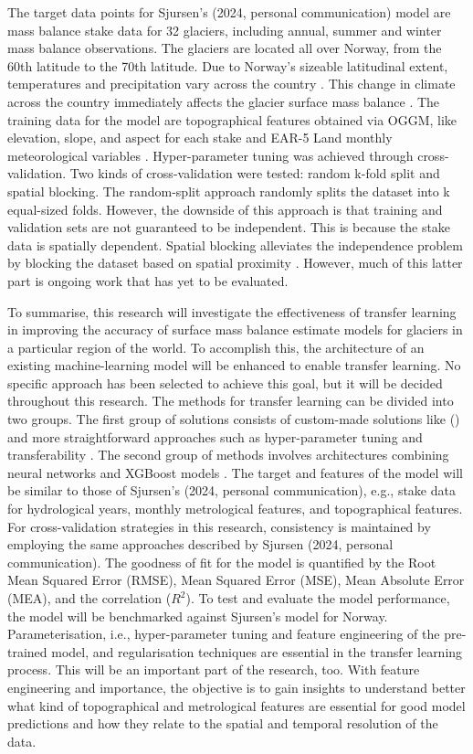 The target data points for Sjursen's (2024, personal communication) model are mass balance stake data for 32 glaciers, including annual, summer and winter mass balance observations. The glaciers are located all over Norway, from the 60th latitude to the 70th latitude. Due to Norway's sizeable latitudinal extent, temperatures and precipitation vary across the country \cite{lussana-2018, lussana-2019}. This change in climate across the country immediately affects the glacier surface mass balance \cite{nesje-2008}. The training data for the model are topographical features obtained via OGGM, like elevation, slope, and aspect for each stake and EAR-5 Land monthly meteorological variables \cite{maussion2019oggm, munoz2019era5}. Hyper-parameter tuning was achieved through cross-validation. Two kinds of cross-validation were tested: random k-fold split and spatial blocking. The random-split approach randomly splits the dataset into k equal-sized folds. However, the downside of this approach is that training and validation sets are not guaranteed to be independent. This is because the stake data is spatially dependent. Spatial blocking alleviates the independence problem by blocking the dataset based on spatial proximity \cite{roberts-2017}. However, much of this latter part is ongoing work that has yet to be evaluated. 

To summarise, this research will investigate the effectiveness of transfer learning in improving the accuracy of surface mass balance estimate models for glaciers in a particular region of the world. To accomplish this, the architecture of an existing machine-learning model will be enhanced to enable transfer learning. No specific approach has been selected to achieve this goal, but it will be decided throughout this research. The methods for transfer learning can be divided into two groups. The first group of solutions consists of custom-made solutions like \citeauthor{sun-2022}(\citeyear{sun-2022}) and more straightforward approaches such as hyper-parameter tuning and transferability \cite{pydata}. The second group of methods involves architectures combining neural networks and XGBoost models \cite{sarkar-2022, he-2022, shietal2018}. The target and features of the model will be similar to those of Sjursen's (2024, personal communication), e.g., stake data for hydrological years, monthly metrological features, and topographical features. For cross-validation strategies in this research, consistency is maintained by employing the same approaches described by Sjursen (2024, personal communication). The goodness of fit for the model is quantified by the Root Mean Squared Error (RMSE), Mean Squared Error (MSE), Mean Absolute Error (MEA), and the correlation ($R^2$). To test and evaluate the model performance, the model will be benchmarked against Sjursen's model for Norway. Parameterisation, i.e., hyper-parameter tuning and feature engineering of the pre-trained model, and regularisation techniques are essential in the transfer learning process. This will be an important part of the research, too.  With feature engineering and importance, the objective is to gain insights to understand better what kind of topographical and metrological features are essential for good model predictions and how they relate to the spatial and temporal resolution of the data. 